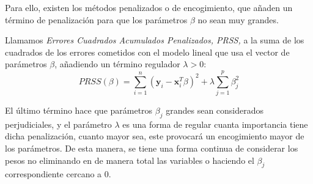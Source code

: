 \noindent Para ello, existen los métodos penalizados o de encogimiento, que añaden un término de penalización para que los parámetros $\beta$ no sean muy grandes.

\begin{defi} 
Llamamos \emph{Errores Cuadrados Acumulados Penalizados, PRSS,} a la suma de los cuadrados de los errores cometidos con el modelo lineal que usa el  vector de parámetros $\beta$, añadiendo un término regulador $\lambda >0$: 
\begin{equation}
PRSS(\beta)=\sum_{i=1}^n(\textbf{y}_i-\textbf{x}_i^T\beta)^2+\lambda\sum_{j=1}^p\beta_j^2
\end{equation}
\end{defi}
\noindent El último término hace que parámetros $\beta_j$ grandes sean considerados perjudiciales, y el parámetro $\lambda$ es una forma de regular cuanta importancia tiene dicha penalización, cuanto mayor sea, este provocará un encogimiento mayor de los parámetros. 
De esta manera, se tiene una forma continua de considerar los pesos no eliminando en de manera total las variables o haciendo el $\beta_j$ correspondiente cercano a 0. 















